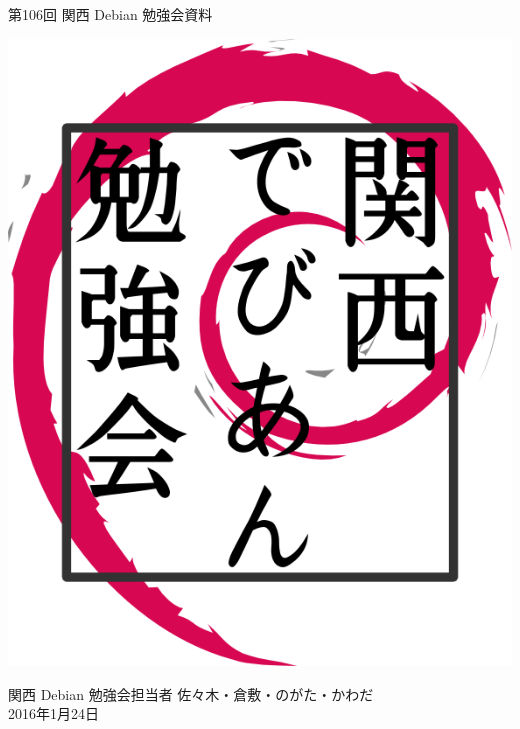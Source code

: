 \documentclass[mingoth,a4paper]{jsarticle}
\newcommand{\debmtgyear}{2016}
\newcommand{\debmtgdate}{24}
\newcommand{\debmtgmonth}{1}
\newcommand{\debmtgnumber}{106}
\begin{document}
\begin{titlepage}


 第\debmtgnumber{}回 関西 Debian 勉強会資料

\vspace{2cm}

\begin{center}
\includegraphics{image200802/kansaidebianlogo.png}
\end{center}

\begin{flushright}
\hfill{}関西 Debian 勉強会担当者 佐々木・倉敷・のがた・かわだ \\
\hfill{}\debmtgyear{}年\debmtgmonth{}月\debmtgdate{}日
\end{flushright}

\thispagestyle{empty}
\end{titlepage}


\vspace{1em}
\end{document}
